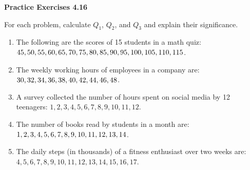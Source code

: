 \vspace{0.3ex}
\noindent\textbf{Practice Exercises 4.16}

\vspace{0.2ex}

For each problem, calculate \(Q_1\), \(Q_2\), and \(Q_3\) and explain their significance.

\begin{enumerate}
    \item The following are the scores of 15 students in a math quiz: \(45, 50, 55, 60, 65, \\ 70, 75, 80, 85, 90, 95, 100, 105, 110, 115\). 
    \item The weekly working hours of employees in a company are: \(30, 32, 34, 36, 38,\\ 40, 42, 44, 46, 48\). 
    \item A survey collected the number of hours spent on social media by 12 teenagers: \(1, 2, 3, 4, 5, 6, 7, 8, 9, 10, 11, 12\). 
    \item The number of books read by students in a month are: \(1, 2, 3, 4, 5, 6, 7, 8, 9, 10,\\ 11, 12, 13, 14\). 
    \item The daily steps (in thousands) of a fitness enthusiast over two weeks are: \(4, 5, 6, 7, 8, 9, 10, 11, 12, 13, 14, 15, 16, 17\). 
\end{enumerate}
